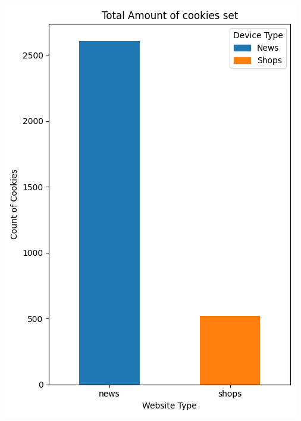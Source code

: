 \begin{minipage}{0.35\textwidth}
    \includegraphics[width=\linewidth]{./assets/comparison2.png}
\end{minipage}


